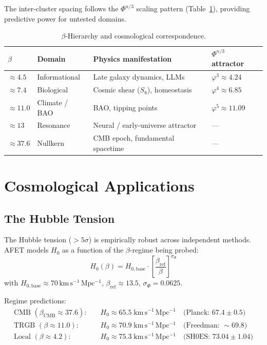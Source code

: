 \documentclass[12pt,a4paper]{article}
\theoremstyle{definition}
\newcommand{\betaref}{\beta_{\mathrm{ref}}}
\newcommand{\betaCMB}{\beta_{\mathrm{CMB}}}
\newcommand{\sigphi}{\sigma_{\Phi}}
\newcommand{\phigold}{\varphi}   %
\newcommand{\PhiAFET}{\Phi}      %
\newcommand{\Hbase}{H_{0,\mathrm{base}}}
\begin{document}
The inter-cluster spacing follows the $\PhiAFET^{n/3}$ scaling pattern
(Table~\ref{tab:beta}), providing predictive power for untested domains.

\begin{table}[h]
\centering
\caption{$\beta$-Hierarchy and cosmological correspondence.}
\label{tab:beta}
\begin{tabular}{llll}
\toprule
$\beta$ & Domain & Physics manifestation & $\PhiAFET^{n/3}$ attractor \\
\midrule
$\approx 4.5$  & Informational & Late galaxy dynamics, LLMs & $\phigold^3 \approx 4.24$ \\
$\approx 7.4$  & Biological    & Cosmic shear ($S_8$), homeostasis & $\phigold^4 \approx 6.85$ \\
$\approx 11.0$ & Climate / BAO & BAO, tipping points & $\phigold^5 \approx 11.09$ \\
$\approx 13$   & Resonance     & Neural / early-universe attractor & --- \\
$\approx 37.6$ & Nullkern      & CMB epoch, fundamental spacetime & --- \\
\bottomrule
\end{tabular}
\end{table}

\section{Cosmological Applications}

\subsection{The Hubble Tension}

\begin{validated}
The Hubble tension ($>5\sigma$) is empirically robust across independent methods.
AFET models $H_0$ as a function of the $\beta$-regime being probed:
\begin{equation}
  H_0(\beta) = \Hbase \cdot \left[\frac{\betaref}{\beta}\right]^{\sigphi}
  \label{eq:H0beta}
\end{equation}
with $\Hbase \approx 70\,\mathrm{km\,s^{-1}\,Mpc^{-1}}$,
$\betaref \approx 13.5$, $\sigphi = 0.0625$.

Regime predictions:
\begin{align*}
  \text{CMB }   (\betaCMB \approx 37.6): &\quad H_0 \approx 65.5\;\mathrm{km\,s^{-1}\,Mpc^{-1}}
    \quad\text{(Planck: }67.4\pm0.5\text{)} \\
  \text{TRGB }  (\beta \approx 11.0):    &\quad H_0 \approx 70.9\;\mathrm{km\,s^{-1}\,Mpc^{-1}}
    \quad\text{(Freedman: }\sim69.8\text{)} \\
  \text{Local } (\beta \approx 4.2):     &\quad H_0 \approx 75.3\;\mathrm{km\,s^{-1}\,Mpc^{-1}}
    \quad\text{(SH0ES: }73.04\pm1.04\text{)}
\end{align*}
\end{validated}
\end{document}
